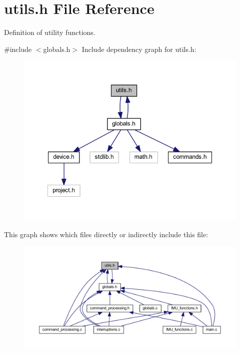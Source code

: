 \section{utils.\+h File Reference}
\label{utils_8h}


Definition of utility functions.  


{\ttfamily \#include $<$globals.\+h$>$}\newline
Include dependency graph for utils.\+h\+:
\nopagebreak
\begin{figure}[H]
\begin{center}
\leavevmode
\includegraphics[width=350pt]{utils_8h__incl}
\end{center}
\end{figure}
This graph shows which files directly or indirectly include this file\+:
\nopagebreak
\begin{figure}[H]
\begin{center}
\leavevmode
\includegraphics[width=350pt]{utils_8h__dep__incl}
\end{center}
\end{figure}
